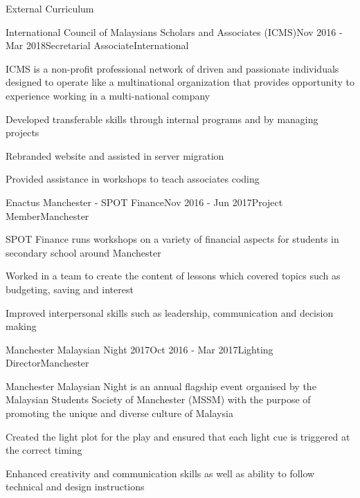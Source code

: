 \documentclass{techresume} %
\begin{document}

\begin{rSection}{External Curriculum}

\begin{rSubsection}{International Council of Malaysians Scholars and Associates (ICMS)}{Nov 2016 - Mar 2018}{Secretarial Associate}{International}
\item ICMS is a non-profit professional network of driven and passionate individuals designed to operate like a multinational organization that provides opportunity to experience working in a multi-national company
\item Developed transferable skills through internal programs and by managing projects
\item Rebranded website and assisted in server migration
\item Provided assistance in workshops to teach associates coding
\end{rSubsection}

\begin{rSubsection}{Enactus Manchester - SPOT Finance}{Nov 2016 - Jun 2017}{Project Member}{Manchester}
\item SPOT Finance runs workshops on a variety of financial aspects for students in secondary school around Manchester
\item Worked in a team to create the content of lessons which covered topics such as budgeting, saving and interest
\item Improved interpersonal skills such as leadership, communication and decision making
\end{rSubsection}

\begin{rSubsection}{Manchester Malaysian Night 2017}{Oct 2016 - Mar 2017}{Lighting Director}{Manchester}
\item Manchester Malaysian Night is an annual flagship event organised by the Malaysian Students Society of Manchester (MSSM) with the purpose of promoting the unique and diverse culture of Malaysia
\item Created the light plot for the play and ensured that each light cue is triggered at the correct timing
\item Enhanced creativity and communication skills as well as ability to follow technical and design instructions
\end{rSubsection}


\end{rSection}
\end{document}
